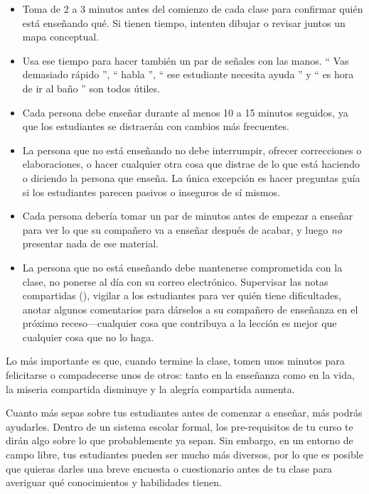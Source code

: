 \begin{itemize}

\item
  Toma de 2 a 3 minutos antes del comienzo de cada clase
  para confirmar quién está enseñando qué.
  Si tienen tiempo,
  intenten dibujar o revisar juntos un mapa conceptual.

\item
  Usa ese tiempo para hacer también un par de señales con las manos.
  `` Vas demasiado rápido '',
  `` habla '',
  `` ese estudiante necesita ayuda ''
  y `` es hora de ir al baño '' son todos útiles.

\item
  Cada persona debe enseñar durante al menos 10 a 15 minutos seguidos,
  ya que los estudiantes se distraerán con cambios más frecuentes.

\item
  La persona que no está enseñando no debe interrumpir,
  ofrecer correcciones o elaboraciones,
  o hacer cualquier otra cosa que distrae de lo que está haciendo o diciendo la persona que enseña.
  La única excepción es hacer preguntas guía
  si los estudiantes parecen pasivos o inseguros de sí mismos.
 
\item
  Cada persona debería tomar un par de minutos antes de empezar a enseñar
  para ver lo que su compañero va a enseñar después de acabar,
  y luego \emph{no} presentar nada de ese material.

\item
  La persona que no está enseñando debe mantenerse comprometida con la clase,
  no ponerse al día con su correo electrónico.
  Supervisar las notas compartidas (),
  vigilar a los estudiantes para ver quién tiene dificultades,
  anotar algunos comentarios para dárselos a su compañero de enseñanza en el próximo receso---cualquier
  cosa que contribuya a la lección es mejor que cualquier cosa que no lo haga.
 
\end{itemize}

Lo más importante es que,
cuando termine la clase, tomen unos minutos para felicitarse o compadecerse unos de otros:
tanto en la enseñanza como en la vida,
la miseria compartida disminuye y la alegría compartida aumenta.


Cuanto más sepas sobre tus estudiantes antes de comenzar a enseñar,
más podrás ayudarles.
Dentro de un sistema escolar formal,
los pre-requisitos de tu curso te dirán algo sobre
lo que probablemente ya sepan.
Sin embargo,
en un entorno de campo libre,
tus estudiantes pueden ser mucho más diversos,
por lo que es posible que quieras darles una breve encuesta o cuestionario antes de tu clase
para averiguar qué conocimientos y habilidades tienen.


